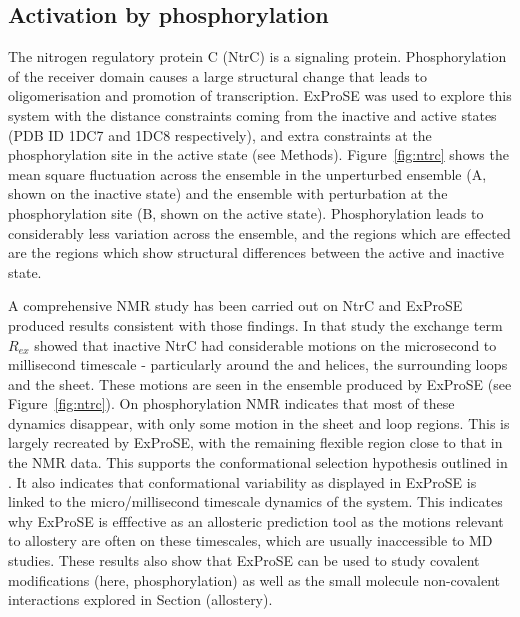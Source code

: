 \subsection{Activation by phosphorylation}

The nitrogen regulatory protein C (NtrC) is a signaling protein.
Phosphorylation of the receiver domain causes a large structural change \cite{Kern1999} that leads to oligomerisation and promotion of transcription.
ExProSE was used to explore this system with the distance constraints coming from the inactive and active states (PDB ID 1DC7 and 1DC8 respectively), and extra constraints at the phosphorylation site in the active state (see Methods).
Figure~\ref{fig:ntrc} shows the mean square fluctuation across the ensemble in the unperturbed ensemble (A, shown on the inactive state) and the ensemble with perturbation at the phosphorylation site (B, shown on the active state).
Phosphorylation leads to considerably less variation across the ensemble, and the regions which are effected are the regions which show structural differences between the active and inactive state.

A comprehensive NMR study has been carried out on NtrC \cite{Volkman2001} and ExProSE produced results consistent with those findings.
In that study the exchange term $R_{ex}$ showed that inactive NtrC had considerable motions on the microsecond to millisecond timescale - particularly around the  and  helices, the surrounding loops and the  sheet.
These motions are seen in the ensemble produced by ExProSE (see Figure~\ref{fig:ntrc}).
On phosphorylation NMR indicates that most of these dynamics disappear, with only some motion in the  sheet and loop regions.
This is largely recreated by ExProSE, with the remaining flexible region close to that in the NMR data.
This supports the conformational selection hypothesis outlined in \cite{Volkman2001}.
It also indicates that conformational variability as displayed in ExProSE is linked to the micro/millisecond timescale dynamics of the system.
This indicates why ExProSE is efffective as an allosteric prediction tool as the motions relevant to allostery are often on these timescales, which are usually inaccessible to MD studies.
These results also show that ExProSE can be used to study covalent modifications (here, phosphorylation) as well as the small molecule non-covalent interactions explored in Section (allostery).


